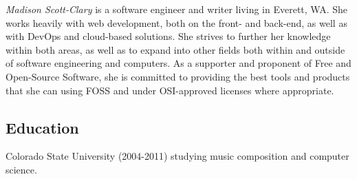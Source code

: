 \documentclass[letterpaper]{memoir}
\begin{document}


\textit{\large Madison Scott-Clary} is a software engineer and writer living in Everett, WA. She works heavily with web development, both on the front- and back-end, as well as with DevOps and cloud-based solutions. She strives to further her knowledge within both areas, as well as to expand into other fields both within and outside of software engineering and computers. As a supporter and proponent of Free and Open-Source Software, she is committed to providing the best tools and products that she can using FOSS and under OSI-approved licenses where appropriate.



\subsection{Education}\label{education}

\begin{description}
\tightlist
\item[University] \hfill
Colorado State University (2004-2011) studying music composition and
computer science.
\end{description}
\end{document}

